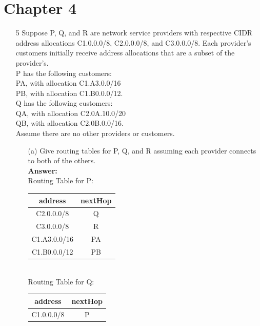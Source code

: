\documentclass[a4paper]{article}
\newcommand\tab[1][0.5cm]{\hspace*{#1}}
\begin{document}
\section*{Chapter 4}
\begin{itemize}
	\item[5] Suppose P, Q, and R are network service providers with respective CIDR address allocations C1.0.0.0/8, C2.0.0.0/8, and C3.0.0.0/8. Each provider’s customers initially receive address allocations that are a subset of the provider’s. \\
	      \tab P has the following customers: \\
	      \tab\tab\tab PA, with allocation C1.A3.0.0/16 \\
	      \tab\tab\tab PB, with allocation C1.B0.0.0/12. \\
	      \tab Q has the following customers: \\
	      \tab\tab\tab QA, with allocation C2.0A.10.0/20 \\
	      \tab\tab\tab QB, with allocation C2.0B.0.0/16. \\
	      Assume there are no other providers or customers.
	      \begin{itemize}
	      	\item[(a)] Give routing tables for P, Q, and R assuming each provider connects to both of the others. \\
	      	      \textbf{Answer:} \\
	      	      Routing Table for P: \\
	      	      \begin{tabular}{|c|c|}
	      	      	\hline
	      	      	address      & nextHop \\
	      	      	\hline
	      	      	C2.0.0.0/8   & Q       \\
	      	      	\hline	
	      	      	C3.0.0.0/8   & R       \\
	      	      	\hline	
	      	      	C1.A3.0.0/16 & PA      \\
	      	      	\hline	
	      	      	C1.B0.0.0/12 & PB      \\
	      	      	\hline
	      	      \end{tabular} \\
	      	      Routing Table for Q: \\
	      	      \begin{tabular}{|c|c|}
	      	      	\hline
	      	      	address       & nextHop \\
	      	      	\hline
	      	      	C1.0.0.0/8    & P       \\

\end{tabular}
\end{itemize}
\end{itemize}
\end{document}
